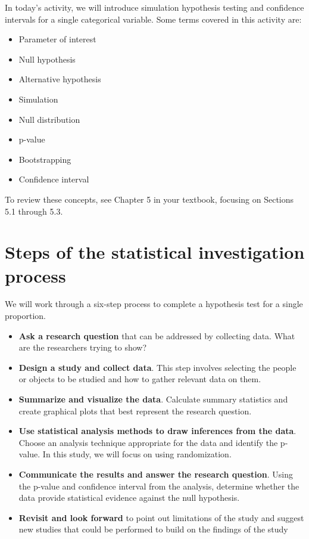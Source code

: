 \documentclass[
]{report}
\begin{document}
In today's activity, we will introduce simulation hypothesis testing and confidence intervals for a single categorical variable. Some terms covered in this activity are:

\begin{itemize}
\item
  Parameter of interest
\item
  Null hypothesis
\item
  Alternative hypothesis
\item
  Simulation
\item
  Null distribution
\item
  p-value
\item
  Bootstrapping
\item
  Confidence interval
\end{itemize}

To review these concepts, see Chapter 5 in your textbook, focusing on Sections 5.1 through 5.3.

\hypertarget{steps-of-the-statistical-investigation-process}{%
\section{Steps of the statistical investigation process}\label{steps-of-the-statistical-investigation-process}}

We will work through a six-step process to complete a hypothesis test for a single proportion.

\begin{itemize}
\item
  \textbf{Ask a research question} that can be addressed by collecting data. What are the researchers trying to show?
\item
  \textbf{Design a study and collect data}. This step involves selecting the people or objects to be studied and how to gather relevant data on them.
\item
  \textbf{Summarize and visualize the data}. Calculate summary statistics and create graphical plots that best represent the research question.
\item
  \textbf{Use statistical analysis methods to draw inferences from the data}. Choose an analysis technique appropriate for the data and identify the p-value. In this study, we will focus on using randomization.
\item
  \textbf{Communicate the results and answer the research question}. Using the p-value and confidence interval from the analysis, determine whether the data provide statistical evidence against the null hypothesis.
\item
  \textbf{Revisit and look forward} to point out limitations of the study and suggest new studies that could be performed to build on the findings of the study
\end{itemize}
\end{document}
